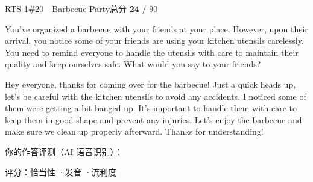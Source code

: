 \begin{qblock}{RTS 1\quad \#20\ \ Barbecue Party}{总分 \textcolor{cAccent}{\bfseries 24} / 90}
\begin{promptbox}
You've organized a barbecue with your friends at your place. However, upon their arrival, you notice some of your friends are using your kitchen utensils carelessly. You need to remind everyone to handle the utensils with care to maintain their quality and keep ourselves safe. What would you say to your friends?
\end{promptbox}
\begin{modelbox}
Hey everyone, thanks for coming over for the barbecue! Just a quick heads up, let's be careful with the kitchen utensils to avoid any accidents. I noticed some of them were getting a bit banged up. It's important to handle them with care to keep them in good shape and prevent any injuries. Let's enjoy the barbecue and make sure we clean up properly afterward. Thanks for understanding!
\end{modelbox}
\smallskip\par{\footnotesize\color{gray}你的作答评测（AI 语音识别）：}
\begin{asrbox}
               
\end{asrbox}
{\small 评分：恰当性 \quad·\quad 发音 \quad·\quad 流利度 }
\end{qblock}

